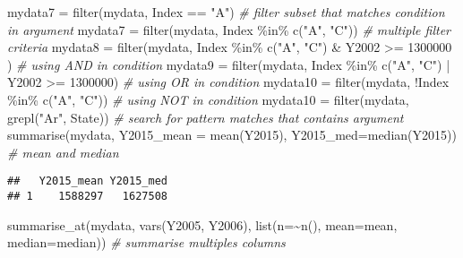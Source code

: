 \documentclass[
]{article}
\newenvironment{Shaded}{\begin{snugshade}}{\end{snugshade}}
\newcommand{\AttributeTok}[1]{\textcolor[rgb]{0.77,0.63,0.00}{#1}}
\newcommand{\CommentTok}[1]{\textcolor[rgb]{0.56,0.35,0.01}{\textit{#1}}}
\newcommand{\DecValTok}[1]{\textcolor[rgb]{0.00,0.00,0.81}{#1}}
\newcommand{\FunctionTok}[1]{\textcolor[rgb]{0.00,0.00,0.00}{#1}}
\newcommand{\NormalTok}[1]{#1}
\newcommand{\OtherTok}[1]{\textcolor[rgb]{0.56,0.35,0.01}{#1}}
\newcommand{\SpecialCharTok}[1]{\textcolor[rgb]{0.00,0.00,0.00}{#1}}
\newcommand{\StringTok}[1]{\textcolor[rgb]{0.31,0.60,0.02}{#1}}
\begin{document}
\begin{Shaded}
\begin{Highlighting}[]
\NormalTok{mydata7 }\OtherTok{=} \FunctionTok{filter}\NormalTok{(mydata, Index }\SpecialCharTok{==} \StringTok{"A"}\NormalTok{) }\CommentTok{\# filter subset that matches condition in argument}
\NormalTok{mydata7 }\OtherTok{=} \FunctionTok{filter}\NormalTok{(mydata, Index }\SpecialCharTok{\%in\%} \FunctionTok{c}\NormalTok{(}\StringTok{"A"}\NormalTok{, }\StringTok{"C"}\NormalTok{)) }\CommentTok{\# multiple filter criteria}
\NormalTok{mydata8 }\OtherTok{=} \FunctionTok{filter}\NormalTok{(mydata, Index }\SpecialCharTok{\%in\%} \FunctionTok{c}\NormalTok{(}\StringTok{"A"}\NormalTok{, }\StringTok{"C"}\NormalTok{) }\SpecialCharTok{\&}\NormalTok{ Y2002 }\SpecialCharTok{\textgreater{}=} \DecValTok{1300000}\NormalTok{ ) }\CommentTok{\# using AND in condition}
\NormalTok{mydata9 }\OtherTok{=} \FunctionTok{filter}\NormalTok{(mydata, Index }\SpecialCharTok{\%in\%} \FunctionTok{c}\NormalTok{(}\StringTok{"A"}\NormalTok{, }\StringTok{"C"}\NormalTok{) }\SpecialCharTok{|}\NormalTok{ Y2002 }\SpecialCharTok{\textgreater{}=} \DecValTok{1300000}\NormalTok{) }\CommentTok{\# using OR in condition}
\NormalTok{mydata10 }\OtherTok{=} \FunctionTok{filter}\NormalTok{(mydata, }\SpecialCharTok{!}\NormalTok{Index }\SpecialCharTok{\%in\%} \FunctionTok{c}\NormalTok{(}\StringTok{"A"}\NormalTok{, }\StringTok{"C"}\NormalTok{)) }\CommentTok{\# using NOT in condition}
\NormalTok{mydata10 }\OtherTok{=} \FunctionTok{filter}\NormalTok{(mydata, }\FunctionTok{grepl}\NormalTok{(}\StringTok{"Ar"}\NormalTok{, State)) }\CommentTok{\# search for pattern matches that contains argument}
\FunctionTok{summarise}\NormalTok{(mydata, }\AttributeTok{Y2015\_mean =} \FunctionTok{mean}\NormalTok{(Y2015), }\AttributeTok{Y2015\_med=}\FunctionTok{median}\NormalTok{(Y2015)) }\CommentTok{\# mean and median}
\end{Highlighting}
\end{Shaded}

\begin{verbatim}
##   Y2015_mean Y2015_med
## 1    1588297   1627508
\end{verbatim}

\begin{Shaded}
\begin{Highlighting}[]
\FunctionTok{summarise\_at}\NormalTok{(mydata, }\FunctionTok{vars}\NormalTok{(Y2005, Y2006), }\FunctionTok{list}\NormalTok{(}\AttributeTok{n=}\SpecialCharTok{\textasciitilde{}}\FunctionTok{n}\NormalTok{(), }\AttributeTok{mean=}\NormalTok{mean, }\AttributeTok{median=}\NormalTok{median)) }\CommentTok{\# summarise multiples columns}
\end{Highlighting}
\end{Shaded}
\end{document}
